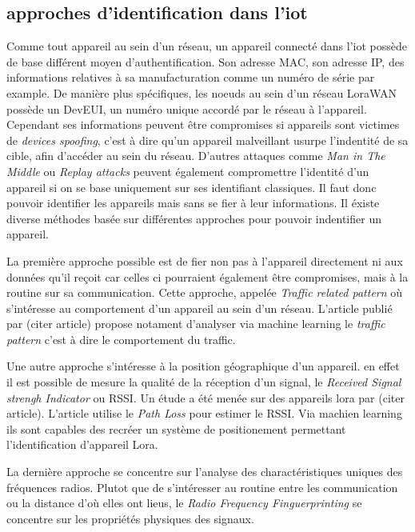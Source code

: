 \subsection{approches d'identification dans l'iot}

Comme tout appareil au sein d'un réseau, un appareil connecté dans l'iot possède de base différent moyen d'authentification. Son adresse MAC, son adresse IP, des informations relatives à sa manufacturation comme un numéro de série par example. De manière plus spécifiques, les noeuds au sein d'un réseau LoraWAN possède un DevEUI, un numéro unique accordé par le réseau à l'appareil. Cependant ses informations peuvent être compromises si appareils sont victimes de \textit{devices spoofing}, c'est à dire qu'un appareil malveillant usurpe l'indentité de sa cible, afin d'accéder au sein du réseau. D'autres attaques comme \textit{Man in The Middle} ou \textit{Replay attacks} peuvent également compromettre l'identité d'un appareil si on se base uniquement sur ses identifiant classiques. Il faut donc pouvoir identifier les appareils mais sans se fier à leur informations. Il éxiste diverse méthodes basée sur différentes approches pour pouvoir indentifier un appareil. 

La première approche possible est de fier non pas à l'appareil directement ni aux données qu'il reçoit car celles ci pourraient également être compromises, mais à la routine sur sa communication. Cette approche, appelée \textit{Traffic related pattern} où s'intéresse au comportement d'un appareil au sein d'un réseau. L'article publié par (citer article) propose notament d'analyser via machine learning le \textit{traffic pattern} c'est à dire le comportement du traffic.

Une autre approche s'intéresse à la position géographique d'un appareil. en effet il est possible de mesure la qualité de la réception d'un signal, le \textit{Received Signal strengh Indicator} ou RSSI. Un étude a été menée sur des appareils lora par (citer article). L'article utilise le \textit{Path Loss} pour estimer le RSSI. Via machien learning ils sont capables des recréer un système de positionement permettant l'identification d'appareil Lora.

La dernière approche se concentre sur l'analyse des charactéristiques uniques des fréquences radios. Plutot que de s'intéresser au routine entre les communication ou la distance d'où elles ont lieus, le \textit{Radio Frequency Finguerprinting} se concentre sur les propriétés physiques des signaux.

